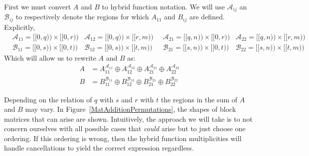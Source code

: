 First we must convert $A$ and $B$ to hybrid function notation. 
We will use $\mathcal{A}_{ij}$ an $\mathcal{B}_{ij}$ to respectively denote the regions for which 
$A_{11}$ and $B_{ij}$ are defined.
Explicitly,
\begin{align*}
	&\mathcal{A}_{11} = [\![0,q)\!) \times [\![0,r)\!) &
	\mathcal{A}_{12} = [\![0,q)\!) \times [\![r,m)\!)\;\; &
	\mathcal{A}_{21} = [\![q,n)\!) \times [\![0,r)\!) &
	\mathcal{A}_{22} = [\![q,n)\!) \times [\![r,m)\!) \\
	&\mathcal{B}_{11} = [\![0,s)\!) \times [\![0,t)\!) &
	\mathcal{B}_{12} = [\![0,s)\!) \times [\![t,m)\!)\;\; &
	\mathcal{B}_{21} = [\![s,n)\!) \times [\![0,t)\!) &
	\mathcal{B}_{22} = [\![s,n)\!) \times [\![t,m)\!)
\end{align*}
Which will allow us to rewrite $A$ and $B$ as:
\begin{align*}
	A &= A_{11}^{\mathcal{A}_{11}} \oplus 
		A_{12}^{\mathcal{A}_{12}} \oplus 
		A_{21}^{\mathcal{A}_{21}} \oplus 
		A_{22}^{\mathcal{A}_{22}} \\
	B &= B_{11}^{\mathcal{B}_{11}} \oplus 
		B_{12}^{\mathcal{B}_{12}} \oplus 
		B_{21}^{\mathcal{B}_{21}} \oplus 
		B_{22}^{\mathcal{B}_{22}} 
\end{align*}


Depending on the relation of $q$ with $s$ and $r$ with $t$ the regions in the sum of $A$ and $B$ may vary.
In Figure~\ref{MatAdditionPermutations}, the shapes of block matrices that can arise are shown.
Intuitively, the approach we will take is to not concern ourselves with all possible cases that \emph{could} arise but to just
choose one ordering.
If this ordering is wrong, then the hybrid function multiplicities will handle cancellations to yield the correct expression regardless.



